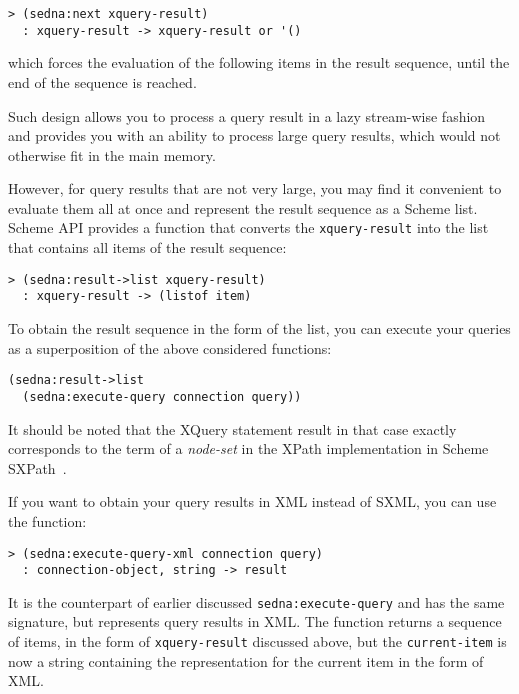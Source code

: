 \documentclass[a4paper,12pt]{article}
\begin{document}
\begin{verbatim}
> (sedna:next xquery-result)
  : xquery-result -> xquery-result or '()
\end{verbatim}

\noindent
which forces the evaluation of the following items in the result sequence, until
the end of the sequence is reached.

Such design allows you to process a query result in a lazy stream-wise fashion
and provides you with an ability to process large query results, which would not
otherwise fit in the main memory.

However, for query results that are not very large, you may find it convenient
to evaluate them all at once and represent the result sequence as a Scheme list.
Scheme API provides a function that converts the \texttt{xquery-result} into the
list that contains all items of the result sequence:

\begin{verbatim}
> (sedna:result->list xquery-result)
  : xquery-result -> (listof item)
\end{verbatim}

\noindent
To obtain the result sequence in the form of the list, you can execute your
queries as a superposition of the above considered functions:

\begin{verbatim}
(sedna:result->list
  (sedna:execute-query connection query))
\end{verbatim}

\noindent
It should be noted that the XQuery statement result in that case exactly
corresponds to the term of a {\em node-set} in the XPath implementation in
Scheme SXPath~\cite{paper:sxpath}.

If you want to obtain your query results in XML instead of SXML, you can use
the function:

\begin{verbatim}
> (sedna:execute-query-xml connection query)
  : connection-object, string -> result
\end{verbatim}

\noindent
It is the counterpart of earlier discussed \texttt{sedna:execute-query} and
has the same signature, but represents query results in XML.
The function returns a sequence of items, in the form of \texttt{xquery-result}
discussed above, but the \texttt{current-item} is now a string containing the
representation for the current item in the form of XML.


\end{document}
